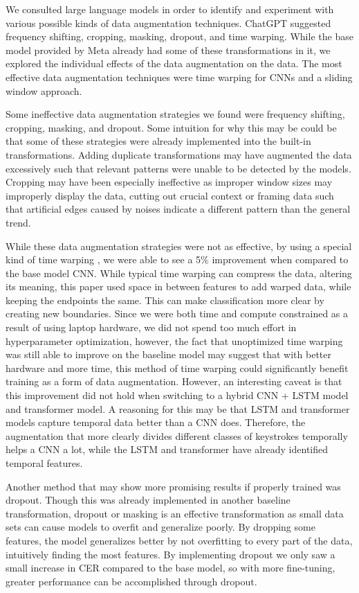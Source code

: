 \documentclass{article}
\begin{document}
We consulted large language models in order to identify and experiment with various possible kinds of data augmentation techniques. ChatGPT suggested frequency shifting, cropping, masking, dropout, and time warping. While the base model provided by Meta already had some of these transformations in it, we explored the individual effects of the data augmentation on the data. The most effective data augmentation techniques were time warping for CNNs and a sliding window approach.

Some ineffective data augmentation strategies we found were frequency shifting, cropping, masking, and dropout. Some intuition for why this may be could be that some of these strategies were already implemented into the built-in transformations. Adding duplicate transformations may have augmented the data excessively such that relevant patterns were unable to be detected by the models. Cropping may have been especially ineffective as improper window sizes may improperly display the data, cutting out crucial context or framing data such that artificial edges caused by noises indicate a different \citet{gogolewski} pattern than the general trend.

While these data augmentation strategies were not as effective, by using a special kind of time warping \citet{kamycki}, we were able to see a 5\% improvement when compared to the base model CNN. While typical time warping can compress the data, altering its meaning, this paper used space in between features to add warped data, while keeping the endpoints the same. This can make classification more clear by creating new boundaries. Since we were both time and compute constrained as a result of using laptop hardware, we did not spend too much effort in hyperparameter optimization, however, the fact that unoptimized time warping was still able to improve on the baseline model may suggest that with better hardware and more time, this method of time warping could significantly benefit training as a form of data augmentation. However, an interesting caveat is that this improvement did not hold when switching to a hybrid CNN + LSTM model and transformer model. A reasoning for this may be that LSTM and transformer models capture temporal data better than a CNN does. Therefore, the augmentation that more clearly divides different classes of keystrokes temporally helps a CNN a lot, while the LSTM and transformer have already identified temporal features. 

Another method that may show more promising results if properly trained was dropout. Though this was already implemented in another baseline transformation, dropout or masking is an effective transformation as small data sets can cause models to overfit and generalize poorly. By dropping some features, the model generalizes better by not overfitting to every part of the data, intuitively finding the most features. By implementing dropout we only saw a small increase in CER compared to the base model, so with more fine-tuning, greater performance can be accomplished through dropout. 
\end{document}
